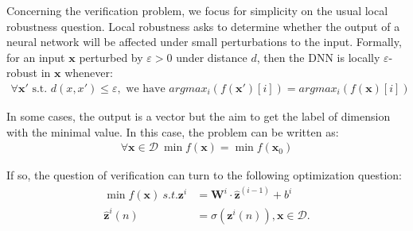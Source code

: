 \documentclass{llncs}
\newcommand{\vx}{\boldsymbol{x}}
\newcommand{\vb}{\boldsymbol{bias}}
\begin{document}

\medskip

Concerning the verification problem, we focus for simplicity on the usual local robustness question. Local robustness asks to determine whether the output of a neural network will be affected under small perturbations to the input. 
Formally, for an input $\vx$ perturbed by $\varepsilon >0$ under distance $d$, then the DNN is locally $\varepsilon$-robust in $\vx$ whenever:
\begin{align*}
	\forall \boldsymbol{x'} \text{ s.t. } d(x,x')\leq \varepsilon, \text{ we have }  
	argmax_i (f(\boldsymbol{x'})[i]) = argmax_i(f(\boldsymbol{x})[i])
\end{align*} 

\iffalse
In some cases, the output is a vector but the aim to get the label of dimension with the minimal value. In this case, the problem can be written as:\begin{align*}
\forall \boldsymbol{x} \in\mathcal{D} \  \min f(\boldsymbol{x}) = \min f(\boldsymbol{x}_0)
\end{align*}

If so, the question of verification can turn to the following optimization question: \begin{align*}
	\min f(\boldsymbol{x}) \ s.t. {\boldsymbol{z}}^{i} &= \boldsymbol{W}^i\cdot \hat{\boldsymbol{z}}^{(i-1)}+ b^i\\
	\hat{\boldsymbol{z}}^{i}(n) &= \sigma({\boldsymbol{z}}^i(n)), \boldsymbol{x}\in\mathcal{D}.
\end{align*}
\end{document}

